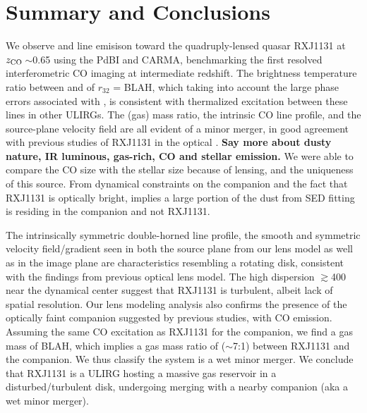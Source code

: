 \documentclass[]{emulateapj}
\begin{document}
\section{Summary and Conclusions} \label{sec:sum}

We observe \bco and \cco line emisison toward the
quadruply-lensed quasar RXJ1131 at $z_{\rm CO}$\,$\sim$0.65 
using the PdBI and CARMA, benchmarking the 
first resolved interferometric CO imaging at intermediate redshift.
The brightness temperature ratio between \bco and \cco of $r_{32}$ = BLAH, which taking into 
account the large phase errors associated with \cco, is consistent with
thermalized excitation between these lines in other ULIRGs.
The (gas) mass ratio, the intrinsic CO line profile,
and the source-plane velocity field are all evident of
a minor merger, in good agreement with previous studies of RXJ1131 in the optical . 
{\bf Say more about dusty nature, IR luminous, gas-rich, CO and stellar emission.}
We were able to compare the CO size with the stellar size because of lensing, and the uniqueness of this source. 
From dynamical constraints on the companion and the fact that RXJ1131 is optically bright, implies 
a large portion of the dust from SED fitting is residing in the companion and not RXJ1131. %

The intrinsically symmetric double-horned line profile, the smooth and
symmetric velocity field/gradient seen in both the source plane from our lens model as well
as in the image plane are characteristics resembling a rotating disk, 
consistent with the findings from previous optical lens model.
The high dispersion $\gtrsim$400\,\kms near the dynamical center suggest that 
RXJ1131 is turbulent, albeit lack of spatial resolution. 
Our lens modeling analysis also confirms the presence of the optically faint companion 
suggested by previous studies, with CO emission.
Assuming the same CO excitation as RXJ1131 for the companion, we find a gas mass of BLAH,
which implies a gas mass ratio of ($\sim$7:1) between RXJ1131 and the companion. 
We thus classify the system is a wet minor merger.
We conclude that RXJ1131 is a ULIRG hosting a massive gas reservoir in a disturbed/turbulent
disk, undergoing merging with a nearby companion (aka a wet minor merger).
\end{document}
